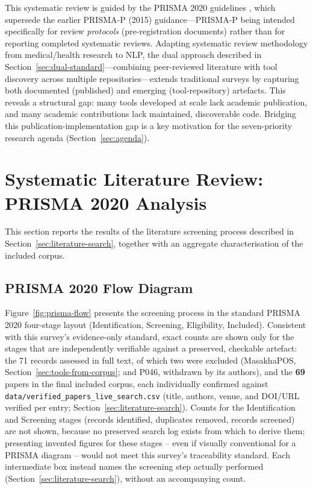 \documentclass[sn-mathphys-num]{sn-jnl}
\theoremstyle{thmstyleone}
\theoremstyle{thmstyletwo}
\theoremstyle{thmstylethree}
\begin{document}
This systematic review is guided by the PRISMA 2020 guidelines \citep{page_prisma_2021}, which supersede the earlier PRISMA-P (2015) guidance---PRISMA-P being intended specifically for review \emph{protocols} (pre-registration documents) rather than for reporting completed systematic reviews. Adapting systematic review methodology from medical/health research to NLP, the dual approach described in Section~\ref{sec:dual-standard}---combining peer-reviewed literature with tool discovery across multiple repositories---extends traditional surveys by capturing both documented (published) and emerging (tool-repository) artefacts. This reveals a structural gap: many tools developed at scale lack academic publication, and many academic contributions lack maintained, discoverable code. Bridging this publication-implementation gap is a key motivation for the seven-priority research agenda (Section~\ref{sec:agenda}).

\section{Systematic Literature Review: PRISMA 2020 Analysis}\label{sec:prisma}

This section reports the results of the literature screening process described in Section~\ref{sec:literature-search}, together with an aggregate characterisation of the included corpus.

\subsection{PRISMA 2020 Flow Diagram}\label{sec:prisma-flow}

Figure~\ref{fig:prisma-flow} presents the screening process in the standard PRISMA 2020 four-stage layout (Identification, Screening, Eligibility, Included). Consistent with this survey's evidence-only standard, exact counts are shown only for the stages that are independently verifiable against a preserved, checkable artefact: the 71 records assessed in full text, of which two were excluded (MasakhaPOS, Section~\ref{sec:tools-from-corpus}; and P046, withdrawn by its authors), and the \textbf{69} papers in the final included corpus, each individually confirmed against \texttt{data/verified\_papers\_live\_search.csv} (title, authors, venue, and DOI/URL verified per entry; Section~\ref{sec:literature-search}). Counts for the Identification and Screening stages (records identified, duplicates removed, records screened) are not shown, because no preserved search log exists from which to derive them; presenting invented figures for these stages -- even if visually conventional for a PRISMA diagram -- would not meet this survey's traceability standard. Each intermediate box instead names the screening step actually performed (Section~\ref{sec:literature-search}), without an accompanying count.
\end{document}
